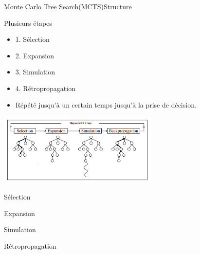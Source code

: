 \begin{frame}{Monte Carlo Tree Search(MCTS)}{Structure}
    \begin{block}{Plusieurs étapes}
	    	\begin{itemize}
	    		\item 1. Sélection
	    		\item 2. Expansion
	    		\item 3. Simulation
	    		\item 4. Rétropropagation
	    		\item Répété jusqu'à un certain temps jusqu'à la prise de décision.
	    	\end{itemize}
		\begin{center}
			\includegraphics[width=8cm]{ressources/MCTSEtapes}
		\end{center}
	\end{block}
\end{frame}

\begin{frame}{Sélection}
\end{frame}

\begin{frame}{Expansion}
\end{frame}

\begin{frame}{Simulation}
\end{frame}

\begin{frame}{Rétropropagation}
\end{frame}